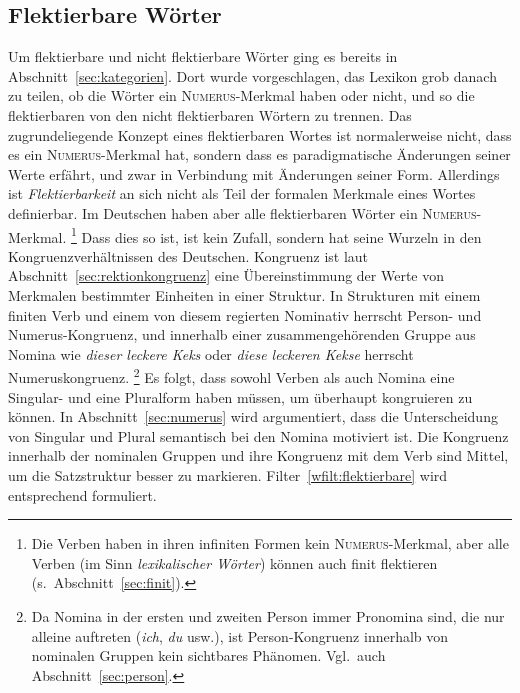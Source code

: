 
\subsection{Flektierbare Wörter}

\label{sec:flektierbarewoerterwortklassen}


Um flektierbare und nicht flektierbare Wörter ging es bereits in Abschnitt~\ref{sec:kategorien}.
Dort wurde vorgeschlagen, das Lexikon grob danach zu teilen, ob die Wörter ein \textsc{Numerus}-Merkmal haben oder nicht, und so die flektierbaren von den nicht flektierbaren Wörtern zu trennen.
Das zugrundeliegende Konzept eines flektierbaren Wortes ist normalerweise nicht, dass es ein \textsc{Numerus}-Merkmal hat, sondern dass es paradigmatische Änderungen seiner Werte erfährt, und zwar in Verbindung mit Änderungen seiner Form.
Allerdings ist \textit{Flektierbarkeit} an sich nicht als Teil der formalen Merkmale eines Wortes definierbar.
Im Deutschen haben aber alle flektierbaren Wörter ein \textsc{Numerus}-Merkmal.%
\footnote{Die Verben haben in ihren infiniten Formen kein \textsc{Numerus}-Merkmal, aber alle Verben (im Sinn \textit{lexikalischer Wörter}) können auch finit flektieren (s.\ Abschnitt~\ref{sec:finit}).}
Dass dies so ist, ist kein Zufall, sondern hat seine Wurzeln in den Kongruenzverhältnissen des Deutschen.
Kongruenz ist laut Abschnitt~\ref{sec:rektionkongruenz} eine Übereinstimmung der Werte von Merkmalen bestimmter Einheiten in einer Struktur.
In Strukturen mit einem finiten Verb und einem von diesem regierten Nominativ herrscht Person- und Numerus-Kongruenz, und innerhalb einer zusammengehörenden Gruppe aus Nomina wie \textit{dieser leckere Keks} oder \textit{diese leckeren Kekse} herrscht Numeruskongruenz.%
\footnote{Da Nomina in der ersten und zweiten Person immer Pronomina sind, die nur alleine auftreten (\textit{ich}, \textit{du} usw.), ist Person-Kongruenz innerhalb von nominalen Gruppen kein sichtbares Phänomen.
Vgl.\ auch Abschnitt~\ref{sec:person}.}
Es folgt, dass sowohl Verben als auch Nomina eine Singular- und eine Pluralform haben müssen, um überhaupt kongruieren zu können.
In Abschnitt~\ref{sec:numerus} wird argumentiert, dass die Unterscheidung von Singular und Plural semantisch bei den Nomina motiviert ist.
Die Kongruenz innerhalb der nominalen Gruppen und ihre Kongruenz mit dem Verb sind Mittel, um die Satzstruktur besser zu markieren.
Filter~\ref{wfilt:flektierbare} wird entsprechend formuliert.

